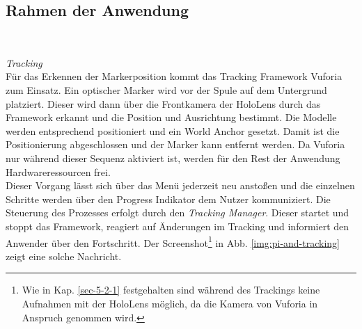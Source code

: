 \subsection{Rahmen der Anwendung}
\vspace{8px}
\begin{center}
	\\
\end{center}
\vspace{6px}


\textit{Tracking}\\
Für das Erkennen der Markerposition kommt das Tracking Framework Vuforia zum Einsatz. Ein optischer Marker wird vor der Spule auf dem Untergrund platziert. Dieser wird dann über die Frontkamera der HoloLens durch das Framework erkannt und die Position und Ausrichtung bestimmt. Die Modelle werden entsprechend positioniert und ein World Anchor gesetzt. Damit ist die Positionierung abgeschlossen und der Marker kann entfernt werden. Da Vuforia nur während dieser Sequenz aktiviert ist, werden für den Rest der Anwendung Hardwareressourcen frei.\\

Dieser Vorgang lässt sich über das Menü jederzeit neu anstoßen und die einzelnen Schritte werden über den Progress Indikator dem Nutzer kommuniziert. Die Steuerung des Prozesses erfolgt durch den \textit{Tracking Manager}. Dieser startet und stoppt das Framework, reagiert auf Änderungen im Tracking und informiert den Anwender über den Fortschritt. Der Screenshot\footnote{Wie in Kap. \ref{sec-5-2-1} festgehalten sind während des Trackings keine Aufnahmen mit der HoloLens möglich, da die Kamera von Vuforia in Anspruch genommen wird.\nopagebreak} in Abb. \ref{img:pi-and-tracking} zeigt eine solche Nachricht.\\

